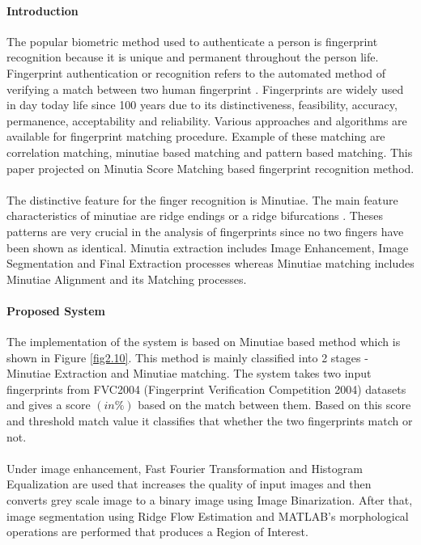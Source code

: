  \paragraph{\textbf{Introduction}}
The popular biometric method used to authenticate a person is fingerprint recognition because it is unique and permanent throughout the person life. Fingerprint authentication or recognition refers to the automated method of verifying a match between two human fingerprint \cite{20}. Fingerprints are widely used in day today life since 100 years due to its distinctiveness, feasibility, accuracy, permanence,  acceptability and reliability. Various approaches and algorithms are available for fingerprint matching procedure. Example of these matching are correlation matching, minutiae based matching and pattern based matching. This paper projected on Minutia Score Matching based fingerprint recognition method. 
\paragraph{}
The distinctive feature for the finger recognition is Minutiae. The main feature characteristics of minutiae are ridge endings or a ridge bifurcations \cite{2}. Theses patterns are very crucial in the analysis of fingerprints since no two fingers have been shown as identical. Minutia extraction includes Image Enhancement, Image Segmentation and Final Extraction processes whereas Minutiae matching includes Minutiae Alignment and its Matching processes.
\paragraph{\textbf{Proposed System}}
The implementation of the system is based on Minutiae based method which is shown in Figure \ref{fig2.10}. This method is mainly classified into 2 stages - Minutiae Extraction and Minutiae matching. The system takes two input fingerprints from FVC2004 (Fingerprint Verification Competition 2004) datasets and gives a score $(in \%)$ based on the match between them. Based on this score and threshold match value it classifies that whether the two fingerprints match or not.

\paragraph{}
Under image enhancement, Fast Fourier Transformation and Histogram Equalization are used that increases the quality of input images and then converts grey scale image to a binary image using Image Binarization. After that, image segmentation using Ridge Flow Estimation and MATLAB’s morphological operations are performed that produces a Region of Interest. 
